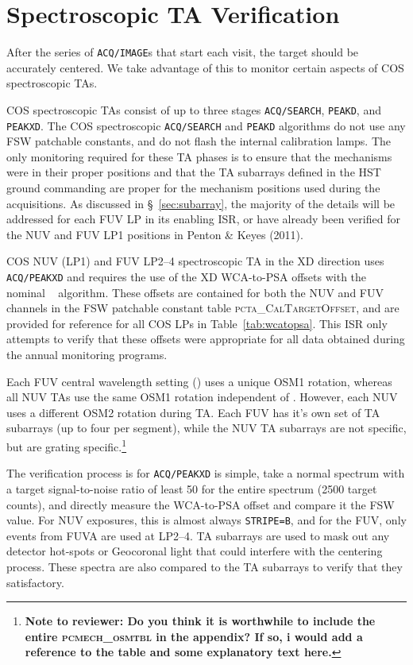 \section{Spectroscopic TA Verification}\label{sec:spVER}
\normalsize
After the series of \texttt{ACQ/IMAGE}s that start each visit, the target should be accurately centered.
We take advantage of this to monitor certain aspects of COS spectroscopic TAs.

COS spectroscopic TAs consist of up to three stages \texttt{ACQ/SEARCH}, \texttt{PEAKD}, and \texttt{PEAKXD}.
The COS spectroscopic \texttt{ACQ/SEARCH} and \texttt{PEAKD} algorithms do not use any FSW patchable constants, and do not flash the
internal calibration lamps. The only monitoring required for these TA phases is to ensure that the mechanisms were in their proper
positions and that the TA subarrays defined in the HST ground commanding are proper for the mechanism positions used during the acquisitions.
As discussed in \S~\ref{sec:subarray}, the majority of the details will be addressed for each FUV LP in its enabling ISR, or have already been verified
for the NUV and FUV LP1 positions in Penton \& Keyes (2011).

COS NUV (LP1) and FUV LP2--4 spectroscopic TA in the XD direction uses \texttt{ACQ/PEAKXD} and requires the use of the XD WCA-to-PSA offsets with the nominal \numposone~ algorithm.
These offsets are contained for both the NUV and FUV channels in the FSW patchable constant table \textsc{pcta\_CalTargetOffset}, and are provided for reference for all COS LPs in Table~\ref{tab:wcatopsa}.
This ISR only attempts to verify that these offsets were appropriate for all data obtained during the annual monitoring programs.

Each FUV central wavelength setting (\cenwave) uses a unique OSM1 rotation, whereas all NUV TAs use the same OSM1 rotation independent of \cenwave.
However, each NUV \cenwave uses a different OSM2 rotation during TA. Each FUV \cenwave has it's own set of TA subarrays (up to four per segment), while the NUV TA subarrays are not \cenwave
specific, but are grating specific.\footnote{{\bf Note to reviewer: Do you think it is worthwhile to include the entire \textsc{pcmech\_osmtbl} in the appendix? If so, i would add a reference to the table and some
explanatory text here.}}

The verification process is for \texttt{ACQ/PEAKXD} is simple, take a normal spectrum with a target signal-to-noise ratio of least 50 for the entire spectrum (2500 target counts),
and directly measure the WCA-to-PSA offset and compare it the FSW value. For NUV exposures, this is almost always \texttt{STRIPE=B}, and for the FUV, only events from FUVA are used at LP2--4.
TA subarrays are used to mask out any detector hot-spots or Geocoronal light that could interfere with the centering process. These spectra are also compared to the TA subarrays to
verify that they satisfactory.


